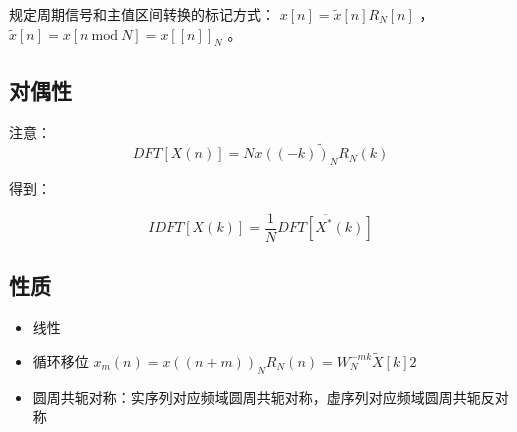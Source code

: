 \documentclass[cn,11pt,chinese,black,simple]{../elegantbook}
\begin{document}
规定周期信号和主值区间转换的标记方式： \(x[n] = \tilde{x}[n] R_N[n]\) ， \(\tilde{x}[n] = x [n \:\mathrm{ mod }\: N] =x[[n]]_N\) 。

\subsection{对偶性}


注意：\[DFT[X(n)] = N \tilde{x((-k))_N R_N(k)}\]

得到：

$$
I D F T [X(k)]=\frac{1}{N} \overline{D F T\left[X^{*}(k)\right]}
$$


\subsection{性质}

\begin{itemize}
    \item 线性
    \item 循环移位 $x_{m}(n)=x((n+m))_{N} R_{N}(n) = W_N^{-mk} \tilde{X}[k]2$
    \item 圆周共轭对称：实序列对应频域圆周共轭对称，虚序列对应频域圆周共轭反对称
\end{itemize}


\let\chapname\undefined
\ifx\mainclass\undefined
\end{document}

